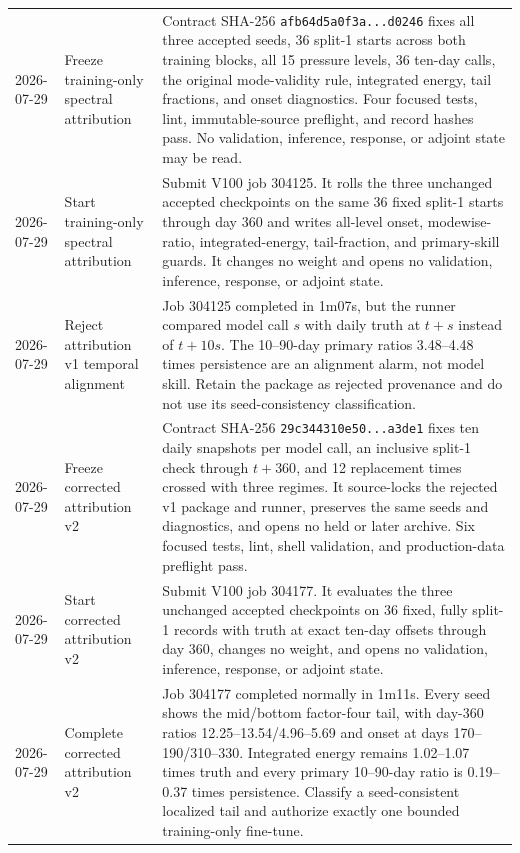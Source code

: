 \documentclass[11pt]{article}
\begin{document}
\begin{longtable}{@{}p{}p{}p{}@{}}
2026-07-29 & Freeze training-only spectral attribution & Contract SHA-256 \texttt{afb64d5a0f3a...d0246} fixes all three accepted seeds, 36 split-1 starts across both training blocks, all 15 pressure levels, 36 ten-day calls, the original mode-validity rule, integrated energy, tail fractions, and onset diagnostics.  Four focused tests, lint, immutable-source preflight, and record hashes pass.  No validation, inference, response, or adjoint state may be read. \\
2026-07-29 & Start training-only spectral attribution & Submit V100 job 304125.  It rolls the three unchanged accepted checkpoints on the same 36 fixed split-1 starts through day 360 and writes all-level onset, modewise-ratio, integrated-energy, tail-fraction, and primary-skill guards.  It changes no weight and opens no validation, inference, response, or adjoint state. \\
2026-07-29 & Reject attribution v1 temporal alignment & Job 304125 completed in 1m07s, but the runner compared model call \(s\) with daily truth at \(t+s\) instead of \(t+10s\).  The 10--90-day primary ratios 3.48--4.48 times persistence are an alignment alarm, not model skill.  Retain the package as rejected provenance and do not use its seed-consistency classification. \\
2026-07-29 & Freeze corrected attribution v2 & Contract SHA-256 \texttt{29c344310e50...a3de1} fixes ten daily snapshots per model call, an inclusive split-1 check through \(t+360\), and 12 replacement times crossed with three regimes.  It source-locks the rejected v1 package and runner, preserves the same seeds and diagnostics, and opens no held or later archive.  Six focused tests, lint, shell validation, and production-data preflight pass. \\
2026-07-29 & Start corrected attribution v2 & Submit V100 job 304177.  It evaluates the three unchanged accepted checkpoints on 36 fixed, fully split-1 records with truth at exact ten-day offsets through day 360, changes no weight, and opens no validation, inference, response, or adjoint state. \\
2026-07-29 & Complete corrected attribution v2 & Job 304177 completed normally in 1m11s.  Every seed shows the mid/bottom factor-four tail, with day-360 ratios 12.25--13.54/4.96--5.69 and onset at days 170--190/310--330.  Integrated energy remains 1.02--1.07 times truth and every primary 10--90-day ratio is 0.19--0.37 times persistence.  Classify a seed-consistent localized tail and authorize exactly one bounded training-only fine-tune. \\

\end{longtable}
\end{document}
